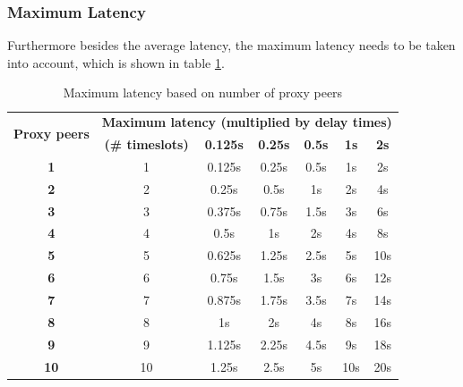 \subsubsection{Maximum Latency}
Furthermore besides the average latency, the maximum latency needs
to be taken into account, which is shown in table \ref{maxlatencypeers}.
\begin{longtable}{|c|c|c|c|c|c|c|}
\caption{Maximum latency based on number of proxy peers}
\label{maxlatencypeers}\\
\hline
\multirow{2}{*}{\textbf{Proxy peers}} & \multicolumn{6}{|l|}{\textbf{Maximum latency (multiplied by delay times)}} \\
& \textbf{(\# timeslots)} & \textbf{0.125s} & \textbf{0.25s} & \textbf{0.5s} & \textbf{1s} & \textbf{2s}\\
\hline
\textbf{1} & 1 & 0.125s & 0.25s & 0.5s & 1s & 2s\\
\hline
\textbf{2} & 2 & 0.25s & 0.5s & 1s & 2s & 4s\\
\hline
\textbf{3} & 3 & 0.375s & 0.75s & 1.5s & 3s & 6s\\
\hline
\textbf{4} & 4 & 0.5s & 1s & 2s & 4s & 8s\\
\hline
\textbf{5} & 5 & 0.625s & 1.25s & 2.5s & 5s & 10s\\
\hline
\textbf{6} & 6 & 0.75s & 1.5s & 3s & 6s & 12s\\
\hline
\textbf{7} & 7 & 0.875s & 1.75s & 3.5s & 7s & 14s\\
\hline
\textbf{8} & 8 & 1s & 2s & 4s & 8s & 16s\\
\hline
\textbf{9} & 9 & 1.125s & 2.25s & 4.5s & 9s & 18s\\
\hline
\textbf{10} & 10 & 1.25s & 2.5s & 5s & 10s & 20s\\
\hline
\end{longtable}
